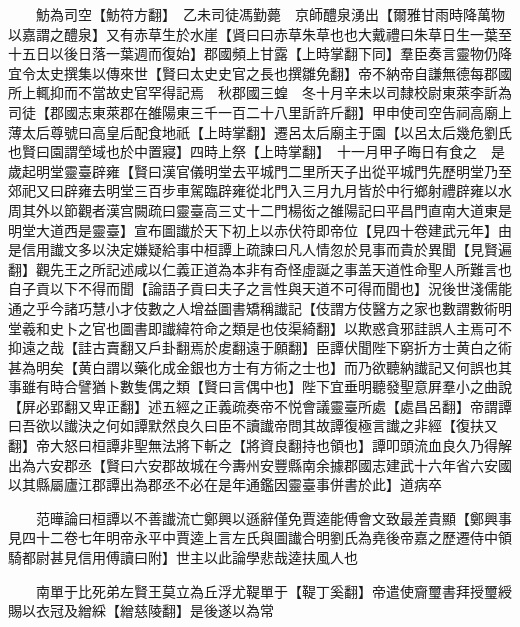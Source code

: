 　　魴為司空【魴符方翻】　乙未司徒馮勤薨　京師醴泉湧出【爾雅甘雨時降萬物以嘉謂之醴泉】又有赤草生於水崖【䝨曰曰赤草朱草也也大戴禮曰朱草日生一葉至十五日以後日落一葉週而復始】郡國頻上甘露【上時掌翻下同】羣臣奏言靈物仍降宜令太史撰集以傳來世【賢曰太史史官之長也撰雛免翻】帝不納帝自謙無德每郡國所上輒抑而不當故史官罕得記焉　秋郡國三蝗　冬十月辛未以司隸校尉東萊李訢為司徒【郡國志東萊郡在雒陽東三千一百二十八里訢許斤翻】甲申使司空告祠高廟上薄太后尊號曰高皇后配食地祇【上時掌翻】遷呂太后廟主于園【以呂太后幾危劉氏也賢曰園謂塋域也於中置寢】四時上祭【上時掌翻】　十一月甲子晦日有食之　是歲起明堂靈臺辟雍【賢曰漢官儀明堂去平城門二里所天子出從平城門先歷明堂乃至郊祀又曰辟雍去明堂三百步車駕臨辟雍從北門入三月九月皆於中行鄉射禮辟雍以水周其外以節觀者漢宫闕疏曰靈臺高三丈十二門楊衒之雒陽記曰平昌門直南大道東是明堂大道西是靈臺】宣布圖䜟於天下初上以赤伏符即帝位【見四十卷建武元年】由是信用䜟文多以決定嫌疑給事中桓譚上疏諫曰凡人情忽於見事而貴於異聞【見賢遍翻】觀先王之所記述咸以仁義正道為本非有奇怪虛誕之事盖天道性命聖人所難言也自子貢以下不得而聞【論語子貢曰夫子之言性與天道不可得而聞也】況後世淺儒能通之乎今諸巧慧小才伎數之人增益圖書矯稱䜟記【伎謂方伎醫方之家也數謂數術明堂羲和史卜之官也圖書即䜟緯符命之類是也伎渠綺翻】以欺惑貪邪詿誤人主焉可不抑遠之哉【詿古賣翻又戶卦翻焉於䖍翻遠于願翻】臣譚伏聞陛下窮折方士黄白之術甚為明矣【黄白謂以藥化成金銀也方士有方術之士也】而乃欲聽納䜟記又何誤也其事雖有時合譬猶卜數隻偶之類【賢曰言偶中也】陛下宜垂明聽發聖意屛羣小之曲說【屏必郢翻又卑正翻】述五經之正義疏奏帝不悦會議靈臺所處【處昌呂翻】帝謂譚曰吾欲以䜟決之何如譚默然良久曰臣不讀䜟帝問其故譚復極言䜟之非經【復扶又翻】帝大怒曰桓譚非聖無法將下斬之【將資良翻持也領也】譚叩頭流血良久乃得解出為六安郡丞【賢曰六安郡故城在今夀州安豐縣南余據郡國志建武十六年省六安國以其縣屬廬江郡譚出為郡丞不必在是年通鑑因靈臺事併書於此】道病卒

　　范曄論曰桓譚以不善䜟流亡鄭興以遜辭僅免賈逵能傅會文致最差貴顯【鄭興事見四十二卷七年明帝永平中賈逵上言左氏與圖䜟合明劉氏為堯後帝嘉之歷遷侍中領騎都尉甚見信用傅讀曰附】世主以此論學悲哉逵扶風人也

　　南單于比死弟左賢王莫立為丘浮尤鞮單于【鞮丁奚翻】帝遣使齎璽書拜授璽綬賜以衣冠及繒綵【繒慈陵翻】是後遂以為常

